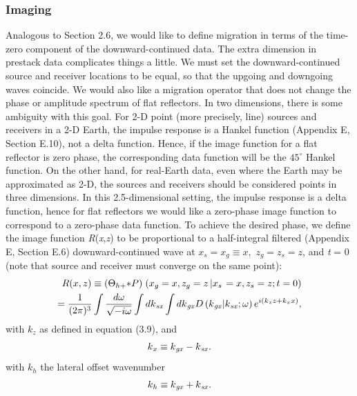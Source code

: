 \subsubsection{Imaging}

Analogous to Section 2.6, we would like to define migration in terms of the time-zero component of the downward-continued data. The extra dimension
in prestack data complicates things a little. We must set the downward-continued source and receiver locations to be equal, so that the upgoing
and downgoing waves coincide. We would also like a migration operator that does not change the phase or amplitude spectrum of flat reflectors.
In two dimensions, there is some ambiguity with this goal. For 2-D point (more precisely, line) sources and receivers in a 2-D
Earth, the impulse response is a Hankel function (Appendix E, Section E.10), not a delta function. Hence, if the image function for a flat reflector
is zero phase, the \nobreak corresponding data function will be the $45^{\circ}$ Hankel function. On the other hand, for real-Earth data, even where
the Earth may be approximated as 2-D, the sources and receivers should be considered points in three dimensions. In this 2.5-dimensional setting, the impulse response is a delta function, hence for flat reflectors we would like a zero-phase image function to correspond
to a zero-phase data function. To achieve the desired phase, we define the image function \textit{R}(\textit{x},\textit{z}) to be proportional
to a half-integral filtered (Appendix E, Section E.6) downward-continued wave at \(x_s=x_g\equiv x,\) \(z_g=z_s=z\), and \textit{t} = 0 (note that source
and receiver must converge on the same point):
\begin{eqnarray}
\text{\textit{$R$}}(\text{\textit{$x,z$}}) \equiv \left(\Theta _{\text{\textit{$h$}}+}\text{\textit{$*$}} \text{\textit{$P$}}\text{\textit{$)$}}\right.\left(\text{\textit{$x_g$}}
=\text{\textit{$x$}},\text{\textit{$z_g$}}=\text{\textit{$z$}}\left|\text{\textit{$x_s$}}\right.=
\text{\textit{$x$}},\text{\textit{$z_s$}}=\text{\textit{$z$}};\text{\textit{$t$}}=0\right)
\nonumber\\
=\frac{1}{(2\pi )^3} \int \frac{d\omega }{\sqrt{-i \omega }} \int d\text{\textit{$k$}}_{\text{\textit{sx}}} \int d\text{\textit{$k$}}_{\text{\textit{gx}}}\text{\textit{$D$}}\left(\text{\textit{$k$}}_{\text{\textit{gx}}}|\text{\textit{$k$}}_{\text{\textit{sx}}};\omega
\right) e^{i\left(\text{\textit{$k$}}_{\text{\textit{$z$}}}\text{\textit{$z$}}+\text{\textit{$k$}}_{\text{\textit{$x$}}}\text{\textit{$x$}}\right)},
\end{eqnarray}
with \(k_z\) as defined in equation (3.9), and
\begin{equation}\text{\textit{$k$}}_{\text{\textit{$x$}}}\equiv \text{\textit{$k$}}_{\text{\textit{gx}}}-\text{\textit{$k$}}_{\text{\textit{sx}}}
.\end{equation}
with \(k_h\) the lateral offset wavenumber
\begin{equation}\text{\textit{$k$}}_{\text{\textit{$h$}}}\equiv \text{\textit{$k$}}_{\text{\textit{gx}}}+\text{\textit{$k$}}_{\text{\textit{sx}}}
.\end{equation}

